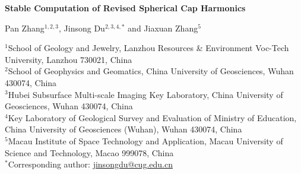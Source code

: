 ﻿\documentclass[11pt,a4paper]{article}
\begin{document}
\begin{center}
{\LARGE\bfseries Stable Computation of Revised Spherical Cap Harmonics\par}
\vspace{1.0em}
{\large Pan Zhang$^{1,2,3}$, Jinsong Du$^{2,3,4,*}$ and Jiaxuan Zhang$^{5}$\par}
\vspace{0.7em}
{\small
$^{1}$School of Geology and Jewelry, Lanzhou Resources \& Environment Voc-Tech University, Lanzhou 730021, China\\
$^{2}$School of Geophysics and Geomatics, China University of Geosciences, Wuhan 430074, China\\
$^{3}$Hubei Subsurface Multi-scale Imaging Key Laboratory, China University of Geosciences, Wuhan 430074, China\\
$^{4}$Key Laboratory of Geological Survey and Evaluation of Ministry of Education, China University of Geosciences (Wuhan), Wuhan 430074, China\\
$^{5}$Macau Institute of Space Technology and Application, Macau University of Science and Technology, Macao 999078, China\\
$^{*}$Corresponding author: \href{mailto:jinsongdu@cug.edu.cn}{jinsongdu@cug.edu.cn}
\par}
\end{center}
\vspace{0.8em}
\end{document}
